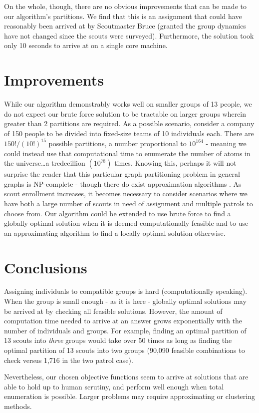 \documentclass{amsart}
\theoremstyle{definition}
\theoremstyle{remark}
\numberwithin{equation}{section}
\begin{document}
On the whole, though, there are no obvious improvements that can be made to our algorithm's partitions. We find that this is an assignment that could have reasonably been arrived at by Scoutmaster Bruce (granted the group dynamics have not changed since the scouts were surveyed).  Furthermore, the solution took only 10 seconds to arrive at on a single core machine.

\section*{Improvements}
While our algorithm demonstrably works well on smaller groups of 13 people, we do not expect our brute force solution to be tractable on larger groups wherein greater than 2 partitions are required. As a possible scenario, consider a company of 150 people to be divided into fixed-size teams of 10 individuals each. There are $150! / (10!)^{15}$ possible partitions, a number proportional to $10^{164}$ - meaning we could instead use that computational time to enumerate the number of atoms in the universe\ldots a tredecillion $(10^{78})$ times. Knowing this, perhaps it will not surprise the reader that this particular graph partitioning problem in general graphs is NP-complete - though there do exist approximation algorithms \cite{E}.
As scout enrollment increases, it becomes necessary to consider scenarios where we have both a large number of scouts in need of assignment and multiple patrols to choose from. Our algorithm could be extended to use brute force to find a globally optimal solution when it is deemed computationally feasible and to use an approximating algorithm to find a locally optimal solution otherwise. 

\section*{Conclusions}
Assigning individuals to compatible groups is hard (computationally speaking). When the group is small enough - as it is here - globally optimal solutions may be arrived at by checking all feasible solutions. However, the amount of computation time needed to arrive at an answer grows exponentially with the number of individuals and groups. For example, finding an optimal partition of 13 scouts into \textit{three} groups would take over 50 times as long as finding the optimal partition of 13 scouts into two groups (90,090 feasible combinations to check versus 1,716 in the two patrol case).


Nevertheless, our chosen objective functions seem to arrive at solutions that are able to hold up to human scrutiny, and perform well enough when total enumeration is possible. Larger problems may require approximating or clustering methods\cite{F}. 
\end{document}
